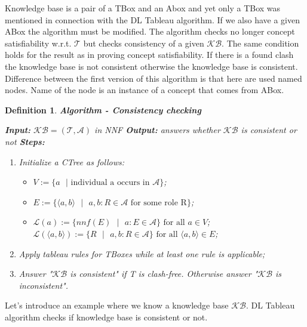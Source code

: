\documentclass[12pt,a4paper]{article}
\newtheorem{definition}{Definition}[subsection]
\begin{document}
Knowledge base is a pair of a TBox and an Abox and yet only a TBox was mentioned in connection with the DL Tableau algorithm. If we also have a given ABox the algorithm must be modified. The algorithm checks no longer concept satisfiability w.r.t. $\mathcal{T}$ but checks consistency of a given $\mathcal{KB}$. The same condition holds for the result as in proving concept satisfiability. If there is a found clash the knowledge base is not consistent otherwise the knowledge base is consistent. Difference between the first version of this algorithm is that here are used named nodes. Name of the node is an instance of a concept that comes from ABox. 

\begin{definition}{\textbf{Algorithm - Consistency checking}}

\noindent \textbf{Input:} $\mathcal{KB} = (\mathcal{T}, \mathcal{A})$ in NNF \newline
\textbf{Output:} answers whether $\mathcal{KB}$ is consistent or not \newline
\textbf{Steps:}
\begin{enumerate}
	\item Initialize a CTree as follows:
		\begin{itemize}
			\item $V := \{ a \text{ } | \text{ individual a occurs in } \mathcal{A} \}$;
			\item $E := \{ \langle a,b \rangle \text{ } | \text{ } a,b : R \in \mathcal{A} \text{ for some role R} \}$;
			\item $\mathcal{L}(a) := \{ nnf(E) \text{ } | \text{ } a:E \in \mathcal{A}\} \text{ for all } a \in V$; \newline
			$\mathcal{L}(\langle a,b \rangle) := \{ R \text{ } | \text{ } a,b:R \in \mathcal{A}\} \text{ for all } \langle a,b \rangle \in E$;
		\end{itemize}
	\item Apply tableau rules for TBoxes while at least one rule is applicable;
	\item Answer "$\mathcal{KB}$ is consistent" if T is clash-free. Otherwise answer "$\mathcal{KB}$ is inconsistent".
\end{enumerate}

\end{definition}

Let's introduce an example where we know a knowledge base $\mathcal{KB}$. DL Tableau algorithm checks if knowledge base is consistent or not.
\end{document}
